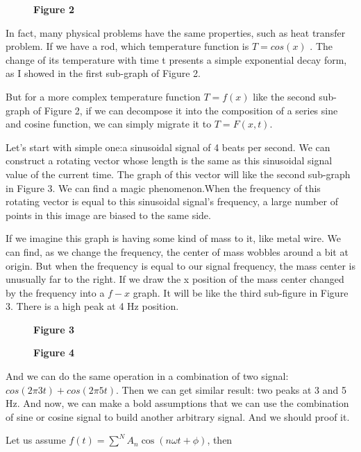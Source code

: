 \documentclass[margin,line]{res}
\begin{document}
\begin{resume}
\begin{figure}[H]
\begin{minipage}{0.55\linewidth}
    \centerline{\textbf{Figure 2}}
  \end{minipage}
\end{figure}
In fact, many physical problems have the same properties, such as heat transfer problem. If we have a rod, which temperature function is $T=cos(x)$ .
The change of its temperature with time t presents a simple exponential decay form, as I showed in the first sub-graph of Figure 2.\par
But for a more complex temperature function $T=f(x)$ like the second sub-graph of Figure 2, if we can decompose it into the composition of a series sine and cosine function, we can simply migrate it to $T=F(x,t)$.\par
Let's start with simple one:a sinusoidal signal of 4 beats per second. We can construct a rotating vector whose length is the same as this sinusoidal signal value of the current time. The graph of this vector will like the second sub-graph in Figure 3. We can find a magic phenomenon.When the frequency of this rotating vector is equal to this sinusoidal signal's frequency, a large number of points in this image are biased to the same side.\par
If we imagine this graph is having some kind of mass to it, like metal wire. We can find, as we change the frequency, the center of mass wobbles around a bit at origin. But when the frequency is equal to our signal frequency, the mass center is unusually far to the right. If we draw the x position of the mass center changed by the frequency into a $f-x$ graph. It will be like the third sub-figure in Figure 3. There is a high peak at 4 Hz position.\par
\begin{figure}[H]
	\begin{minipage}{0.48\linewidth}
		\centerline{}
		\centerline{\textbf{Figure 3}}
	\end{minipage}
	\begin{minipage}{0.48\linewidth}
		\centerline{}
		\centerline{\textbf{Figure 4}}
	\end{minipage}
\end{figure}
And we can do the same operation in a combination of two signal: $cos(2\pi 3t)+cos(2\pi 5t)$. Then we can get similar result: two peaks at 3 and 5 Hz. And now, we can make a bold assumptions that we can use the combination of sine or cosine signal to build another arbitrary signal. And we should proof it.\par
Let us assume $f(t)=\sum\limits^{N}A_n \cos (n\omega t+\phi)$, then


\end{resume}
\end{document}
